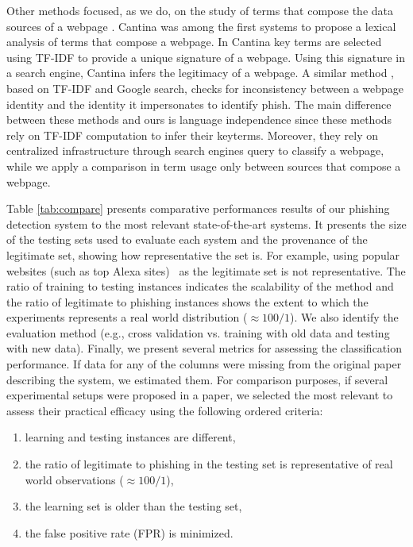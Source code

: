 \documentclass[10pt,conference,compsocconf,letterpaper]{IEEEtran}
\begin{document}
Other methods focused, as we do, on the study of terms that compose the data sources of a webpage \cite{Blum:2010:lexical,le:2011:phishdef,Marchal:2012:proactive,marchal:2014:phishstorm}. 
Cantina \cite{xiang:2011:cantina,zhang:2007:cantina} was among the first systems to propose a lexical analysis of terms that compose a webpage. In Cantina \cite{zhang:2007:cantina} key terms are selected  using TF-IDF to provide a unique signature of a webpage. Using this signature in a  search engine, Cantina infers the legitimacy of a webpage. A similar method \cite{Xiang:2009:hybrid}, based on TF-IDF and Google search, checks for inconsistency between a webpage identity and the identity it impersonates to identify phish. The main difference between these methods and ours is language independence since these methods rely on TF-IDF computation to infer their keyterms. Moreover, they rely on centralized infrastructure through search engines query to classify a webpage, while we apply a comparison in term usage only between sources that compose a webpage.


Table \ref{tab:compare} presents comparative performances results of our phishing detection system to the most relevant state-of-the-art systems. It presents the size of the testing sets used to evaluate each system and the provenance of the legitimate set, showing how representative the set is.  For example, using popular websites (such as top Alexa sites)~\cite{Chen:2014:anti,ramesh:2014:efficious} as the legitimate set is not representative. The ratio of training to testing instances indicates the scalability of the method and the ratio of legitimate to phishing instances shows the extent to which the experiments represents a real world distribution ($ \approx 100/1$). We also identify the evaluation method (e.g., cross validation vs. training with old data and testing with new data). Finally, we present several metrics for assessing the classification performance. If data for any of the columns were missing from the original paper describing the system, we estimated them.
For comparison purposes, if several experimental setups were proposed in a paper, we selected the most relevant to assess their practical efficacy using the following ordered criteria:

\begin{enumerate}[topsep=0pt,itemsep=-1ex,partopsep=0pt,parsep=1ex]
\item learning and testing instances are different,
 \item the ratio of legitimate to phishing in the testing set is representative of real world observations ($ \approx 100/1$),
 \item the learning set is older than the testing set,
 \item the false positive rate (FPR) is minimized.
\end{enumerate}
\end{document}

